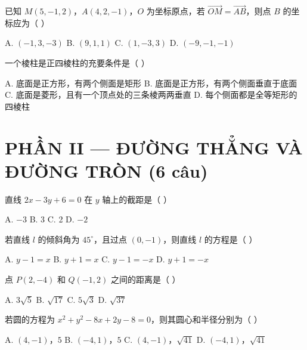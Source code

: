 \documentclass[11pt, a4paper]{article}
\begin{document}
\begin{baitap}[14]
已知 $M(5,-1,2)$，$A(4,2,-1)$，$O$ 为坐标原点，若 $\overrightarrow{OM} = \overrightarrow{AB}$，则点 $B$ 的坐标应为（ ）
\par\vspace{3pt}
\noindent A. $(-1,3,-3)$ \quad B. $(9,1,1)$ \quad C. $(1,-3,3)$ \quad D. $(-9,-1,-1)$
\end{baitap}

\begin{baitap}[15]
一个棱柱是正四棱柱的充要条件是（ ）
\par\vspace{3pt}
\noindent A. 底面是正方形，有两个侧面是矩形 \quad B. 底面是正方形，有两个侧面垂直于底面 \quad C. 底面是菱形，且有一个顶点处的三条棱两两垂直 \quad D. 每个侧面都是全等矩形的四棱柱
\end{baitap}

\section{PHẦN II — ĐƯỜNG THẲNG VÀ ĐƯỜNG TRÒN (6 câu)}

\begin{baitap}[16]
直线 $2x - 3y + 6 = 0$ 在 $y$ 轴上的截距是（ ）
\par\vspace{3pt}
\noindent A. $-3$ \quad B. 3 \quad C. 2 \quad D. $-2$
\end{baitap}

\begin{baitap}[17]
若直线 $l$ 的倾斜角为 $45^\circ$，且过点 $(0,-1)$，则直线 $l$ 的方程是（ ）
\par\vspace{3pt}
\noindent A. $y - 1 = x$ \quad B. $y + 1 = x$ \quad C. $y - 1 = -x$ \quad D. $y + 1 = -x$
\end{baitap}

\begin{baitap}[18]
点 $P(2,-4)$ 和 $Q(-1,2)$ 之间的距离是（ ）
\par\vspace{3pt}
\noindent A. $3\sqrt{5}$ \quad B. $\sqrt{17}$ \quad C. $5\sqrt{3}$ \quad D. $\sqrt{37}$
\end{baitap}

\begin{baitap}[19]
若圆的方程为 $x^2 + y^2 - 8x + 2y - 8 = 0$，则其圆心和半径分别为（ ）
\par\vspace{3pt}
\noindent A. $(4,-1)$，$5$ \quad B. $(-4,1)$，$5$ \quad C. $(4,-1)$，$\sqrt{41}$ \quad D. $(-4,1)$，$\sqrt{41}$
\end{baitap}
\end{document}
